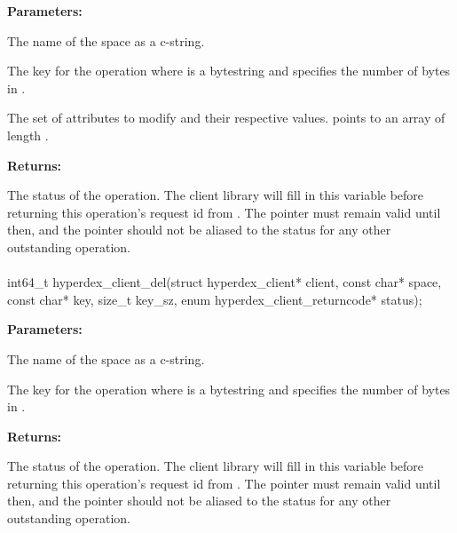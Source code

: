 \noindent\textbf{Parameters:}
\begin{description}[labelindent=\widthof{{\code{attrs}, \code{attrs\_sz}}},leftmargin=*,noitemsep,nolistsep,align=right]
\item[\code{space}] The name of the space as a c-string.
\item[\code{key}, \code{key\_sz}] The key for the operation where  is a bytestring and  specifies the number of bytes in .
\item[\code{attrs}, \code{attrs\_sz}] The set of attributes to modify and their respective values.   points to an array of length .
\end{description}

\noindent\textbf{Returns:}
\begin{description}[labelindent=\widthof{{\code{status}}},leftmargin=*,noitemsep,nolistsep,align=right]
\item[\code{status}] The status of the operation.  The client library will fill in this variable before returning this operation's request id from .  The pointer must remain valid until then, and the pointer should not be aliased to the status for any other outstanding operation.
\end{description}

\paragraph{}
\label{api:c:del}
\begin{ccode}
int64_t hyperdex_client_del(struct hyperdex_client* client,
        const char* space,
        const char* key, size_t key_sz,
        enum hyperdex_client_returncode* status);
\end{ccode}
\funcdesc 

\noindent\textbf{Parameters:}
\begin{description}[labelindent=\widthof{{\code{key}, \code{key\_sz}}},leftmargin=*,noitemsep,nolistsep,align=right]
\item[\code{space}] The name of the space as a c-string.
\item[\code{key}, \code{key\_sz}] The key for the operation where  is a bytestring and  specifies the number of bytes in .
\end{description}

\noindent\textbf{Returns:}
\begin{description}[labelindent=\widthof{{\code{status}}},leftmargin=*,noitemsep,nolistsep,align=right]
\item[\code{status}] The status of the operation.  The client library will fill in this variable before returning this operation's request id from .  The pointer must remain valid until then, and the pointer should not be aliased to the status for any other outstanding operation.
\end{description}

